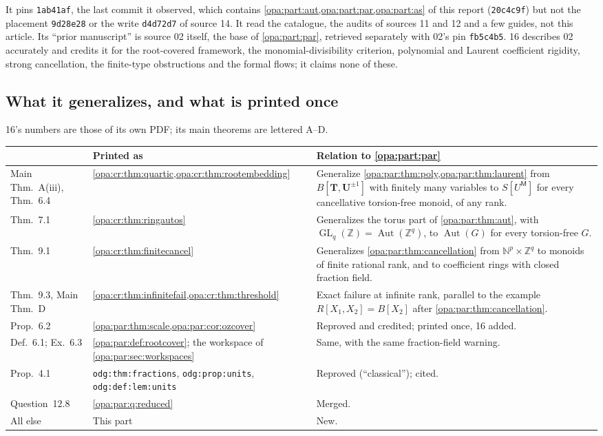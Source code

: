 \documentclass[11pt,oneside]{article}
\numberwithin{equation}{section}
\theoremstyle{definition}
\theoremstyle{remark}
\newcommand{\Z}{\mathbb Z}
\newcommand{\N}{\mathbb N}
\newcommand{\Aut}{\operatorname{Aut}}
\newcommand{\GL}{\operatorname{GL}}
\newcommand{\lbl}[1]{\nolinkurl{#1}}
\begin{document}
It pins \texttt{1ab41af}, the last commit it observed, which contains \cref{opa:part:aut,opa:part:par,opa:part:as}
of this report (\texttt{20c4c9f}) but not the placement \texttt{9d28e28} or the write \texttt{d4d72d7} of
source 14. It read the catalogue, the audits of sources 11 and 12 and a few guides, not this article.
Its ``prior manuscript'' is source 02 itself, the base of \cref{opa:part:par}, retrieved separately with
02's pin \texttt{fb5c4b5}. 16 describes 02 accurately and credits it for the root-covered framework, the
monomial-divisibility criterion, polynomial and Laurent coefficient rigidity, strong cancellation, the
finite-type obstructions and the formal flows; it claims none of these.

\subsection{What it generalizes, and what is printed once}\label{opa:cr:sub:once}

16's numbers are those of its own PDF; its main theorems are lettered A--D.

\begin{center}
\renewcommand{\arraystretch}{1.15}
\begin{longtable}{>{\raggedright\arraybackslash}p{}>{\raggedright\arraybackslash}p{}>{\raggedright\arraybackslash}p{}}
\toprule
16 & Printed as & Relation to \cref{opa:part:par}\\
\midrule
\endhead
Main Thm.~A(iii), Thm.~6.4 & \cref{opa:cr:thm:quartic,opa:cr:thm:rootembedding} & Generalize
\cref{opa:par:thm:poly,opa:par:thm:laurent} from $B[\mathbf T,\mathbf U^{\pm1}]$ with finitely many
variables to $S[U^{\mathsf M}]$ for every cancellative torsion-free monoid, of any rank.\\
Thm.~7.1 & \cref{opa:cr:thm:ringautos} & Generalizes the torus part of \cref{opa:par:thm:aut}, with
$\GL_q(\Z)=\Aut(\Z^q)$, to $\Aut(G)$ for every torsion-free $G$.\\
Thm.~9.1 & \cref{opa:cr:thm:finitecancel} & Generalizes \cref{opa:par:thm:cancellation} from
$\N^p\times\Z^q$ to monoids of finite rational rank, and to coefficient rings with closed fraction field.\\
Thm.~9.3, Main Thm.~D & \cref{opa:cr:thm:infinitefail,opa:cr:thm:threshold} & Exact failure at infinite
rank, parallel to the example $R[X_1,X_2]=B[X_2]$ after \cref{opa:par:thm:cancellation}.\\
Prop.~6.2 & \cref{opa:par:thm:scale,opa:par:cor:ozcover} & Reproved and credited; printed once, 16
added.\\
Def.~6.1; Ex.~6.3 & \cref{opa:par:def:rootcover}; the workspace of \cref{opa:par:sec:workspaces} & Same,
with the same fraction-field warning.\\
Prop.~4.1 & \lbl{odg:thm:fractions}, \lbl{odg:prop:units}, \lbl{odg:def:lem:units} & Reproved (``classical'');
cited.\\
Question~12.8 & \cref{opa:par:q:reduced} & Merged.\\
All else & This part & New.\\
\bottomrule
\end{longtable}
\end{center}
\end{document}
